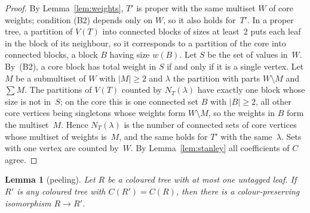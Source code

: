 \documentclass[11pt]{article}
\newtheorem{lemma}{Lemma}
\theoremstyle{definition}
\theoremstyle{remark}
\begin{document}
\begin{proof}
By Lemma~\ref{lem:weights}, $T'$ is proper with the same multiset $W$ of core
weights; condition (B2) depends only on $W$, so it also holds for~$T'$. In a
proper tree, a partition of $V(T)$ into connected blocks of sizes at least~$2$
puts each leaf in the block of its neighbour, so it corresponds to a partition of
the core into connected blocks, a block $B$ having size $w(B)$. Let $S$ be the
set of values in~$W$. By~(B2), a core block has total weight in $S$ if and only
if it is a single vertex. Let $M$ be a submultiset of $W$ with $|M|\ge2$ and
$\lambda$ the partition with parts $W\setminus M$ and $\sum M$. The partitions of
$V(T)$ counted by $N_T(\lambda)$ have exactly one block whose size is not in~$S$;
on the core this is one connected set $B$ with $|B|\ge2$, all other core vertices
being singletons whose weights form $W\setminus M$, so the weights in $B$ form the
multiset~$M$. Hence $N_T(\lambda)$ is the number of connected sets of core
vertices whose multiset of weights is~$M$, and the same holds for $T'$ with the
same~$\lambda$. Sets with one vertex are counted by~$W$. By
Lemma~\ref{lem:stanley} all coefficients of $C$ agree.
\end{proof}

\begin{lemma}[peeling]\label{lem:colour}
Let $R$ be a coloured tree with at most one untagged leaf. If $R'$ is any
coloured tree with $C(R')=C(R)$, then there is a colour-preserving isomorphism
$R\to R'$.
\end{lemma}
\end{document}
